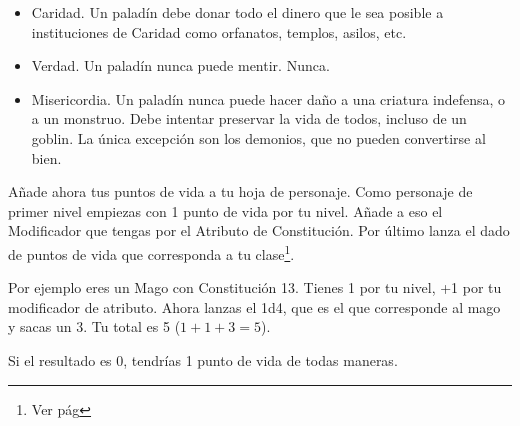 \begin{multicols}{2}
\begin{itemize}
\item Caridad. Un paladín debe donar todo el dinero que le sea posible a instituciones
de Caridad como orfanatos, templos, asilos, etc.
\item Verdad. Un paladín nunca puede mentir. Nunca.
\item Misericordia. Un paladín nunca puede hacer daño a una criatura indefensa,
o a un monstruo. Debe intentar preservar la vida de todos, incluso de un goblin.
La única excepción son los demonios, que no pueden convertirse al bien.
\end{itemize}


Añade ahora tus puntos de vida a tu hoja de personaje. Como personaje de primer nivel empiezas con 1
punto de vida por tu nivel. Añade a eso el Modificador que tengas por el
Atributo de Constitución. Por último lanza el dado de puntos de vida que
corresponda a tu clase\footnote{Ver pág \pageref{c:clases}}.

Por ejemplo eres un Mago con Constitución 13. Tienes 1 por tu nivel, +1 por tu
modificador de atributo. Ahora lanzas el 1d4, que es el que corresponde al mago
y sacas un 3. Tu total es 5 ($1 + 1 + 3 = 5$).

Si el resultado es 0, tendrías 1 punto de vida de todas maneras.



\end{multicols}
